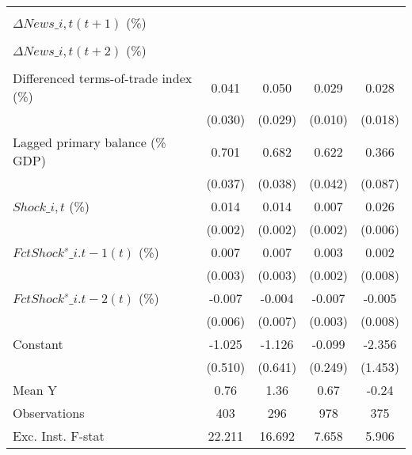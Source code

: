 {\begin{tabular}{l*{4}{c}}
                    &                     &                     &                     &                     \\
\addlinespace
$ \Delta News\_{i,t}(t+1)$ (\%)&                     &                     &                     &                     \\
                    &                     &                     &                     &                     \\
\addlinespace
$ \Delta News\_{i,t}(t+2)$ (\%)&                     &                     &                     &                     \\
                    &                     &                     &                     &                     \\
\addlinespace
Differenced terms-of-trade index (\%)&       0.041         &       0.050         &       0.029\sym{***}&       0.028         \\
                    &     (0.030)         &     (0.029)         &     (0.010)         &     (0.018)         \\
\addlinespace
Lagged primary balance (\% GDP)&       0.701\sym{***}&       0.682\sym{***}&       0.622\sym{***}&       0.366\sym{***}\\
                    &     (0.037)         &     (0.038)         &     (0.042)         &     (0.087)         \\
\addlinespace
$ Shock\_{i,t}$ (\%) &       0.014\sym{***}&       0.014\sym{***}&       0.007\sym{***}&       0.026\sym{***}\\
                    &     (0.002)         &     (0.002)         &     (0.002)         &     (0.006)         \\
\addlinespace
$ FctShock^s\_{i.t-1}(t)$ (\%)&       0.007\sym{**} &       0.007\sym{*}  &       0.003\sym{*}  &       0.002         \\
                    &     (0.003)         &     (0.003)         &     (0.002)         &     (0.008)         \\
\addlinespace
$ FctShock^s\_{i.t-2}(t)$ (\%)&      -0.007         &      -0.004         &      -0.007\sym{**} &      -0.005         \\
                    &     (0.006)         &     (0.007)         &     (0.003)         &     (0.008)         \\
\addlinespace
Constant            &      -1.025\sym{*}  &      -1.126\sym{*}  &      -0.099         &      -2.356         \\
                    &     (0.510)         &     (0.641)         &     (0.249)         &     (1.453)         \\
\midrule
Mean Y              &        0.76         &        1.36         &        0.67         &       -0.24         \\
Observations        &         403         &         296         &         978         &         375         \\
Exc. Inst. F-stat   &      22.211         &      16.692         &       7.658         &       5.906         \\
\bottomrule
\end{tabular}
}
